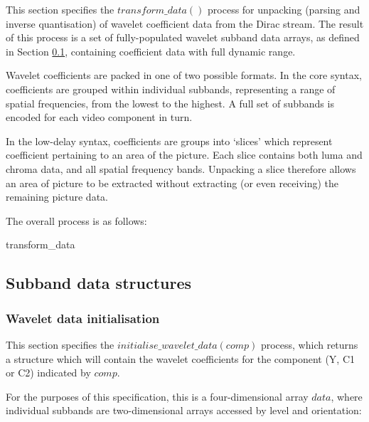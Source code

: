 This section specifies the $transform\_data()$ process for
unpacking (parsing and inverse
quantisation) of wavelet coefficient data
from the Dirac stream. The result of this process is a set
of fully-populated wavelet subband data arrays, as defined in
Section \ref{wltdecodeconventions}, containing coefficient
data with full dynamic range.

Wavelet coefficients are packed in one of two possible formats.
In the core syntax, coefficients are grouped within individual
subbands, representing a range of spatial frequencies, from the
lowest to the highest. A full set of subbands is encoded for each
video component in turn. 

In the low-delay syntax, coefficients
are groups into `slices' which represent coefficient pertaining
to an area of the picture. Each slice contains both luma and chroma
data, and all spatial frequency bands. Unpacking a slice therefore
allows an area of picture to be extracted without extracting (or even
receiving) the remaining picture data.

The overall process is as follows:

\begin{pseudo}{transform\_data}{}
\bsELSE
\bsEND
\end{pseudo}

\subsection{Subband data structures}
\label{wltdecodeconventions}

\subsubsection{Wavelet data initialisation}

\label{wltinit}

This section specifies the $initialise\_wavelet\_data(comp)$ process, which returns a structure which will
contain the wavelet coefficients for the component (Y, C1 or C2) indicated by $comp$. 

For the purposes of this specification, this is a four-dimensional array $data$,
where individual subbands are two-dimensional arrays accessed by level and orientation:

